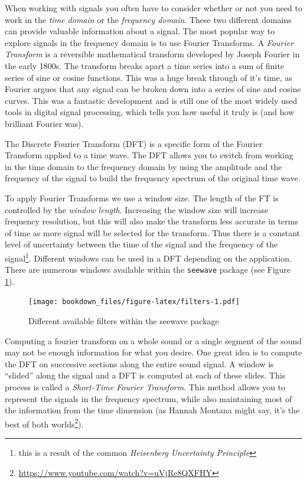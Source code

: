 \documentclass[
]{krantz}
\renewcommand{\href}[2]{#2\footnote{\url{#1}}}
\begin{document}
When working with signals you often have to consider whether or not you need to work in the \emph{time domain} or the \emph{frequency domain}. These two different domains can provide valuable information about a signal. The most popular way to explore signals in the frequency domain is to use Fourier Transforms. A \emph{Fourier Transform} is a reversible mathematical transform developed by Joseph Fourier in the early 1800s. The transform breaks apart a time series into a sum of finite series of sine or cosine functions. This was a huge break through of it's time, as Fourier argues that any signal can be broken down into a series of sine and cosine curves. This was a fantastic development and is still one of the most widely used tools in digital signal processing, which tells you how useful it truly is (and how brilliant Fourier was).

The Discrete Fourier Transform (DFT) is a specific form of the Fourier Transform applied to a time wave. The DFT allows you to switch from working in the time domain to the frequency domain by using the amplitude and the frequency of the signal to build the frequency spectrum of the original time wave.

To apply Fourier Transforms we use a window size. The length of the FT is controlled by the \emph{window length}. Increasing the window size will increase frequency resolution, but this will also make the transform less accurate in terms of time as more signal will be selected for the transform. Thus there is a constant level of uncertainty between the time of the signal and the frequency of the signal\footnote{this is a result of the common \emph{Heisenberg Uncertainty Principle}}. Different windows can be used in a DFT depending on the application. There are numerous windows available within the \texttt{seewave} package (see Figure \ref{fig:filters}).

\begin{figure}
\centering
\texttt{[image: bookdown\_files/figure-latex/filters-1.pdf]}
\caption{\label{fig:filters}Different available filters within the seewave package}
\end{figure}

Computing a fourier transform on a whole sound or a single segment of the sound may not be enough information for what you desire. One great idea is to compute the DFT on successive sections along the entire sound signal. A window is ``slided'' along the signal and a DFT is computed at each of these slides. This process is called a \emph{Short-Time Fourier Transform}. This method allows you to represent the signals in the frequency spectrum, while also maintaining most of the information from the time dimension (as Hannah Montana might say, it's the \href{https://www.youtube.com/watch?v=uVjRe8QXFHY}{best of both worlds}).
\end{document}
